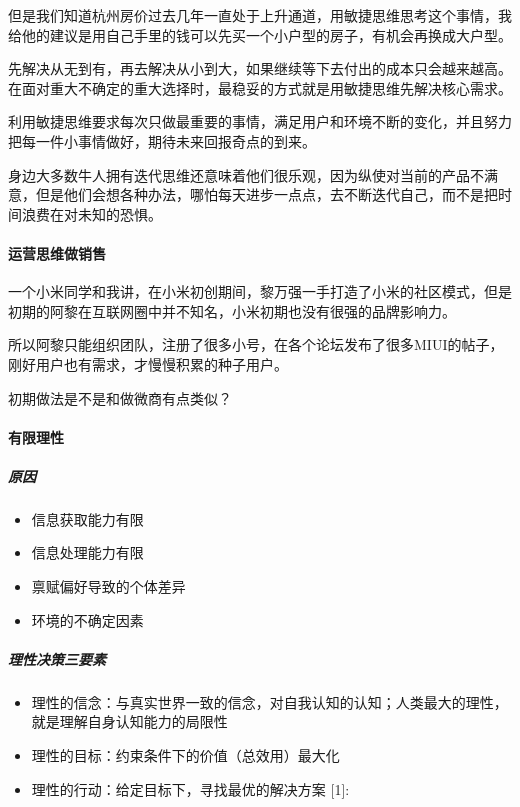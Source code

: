 \documentclass[letterpaper,11pt,english]{sphinxmanual}
\begin{document}
但是我们知道杭州房价过去几年一直处于上升通道，用敏捷思维思考这个事情，我给他的建议是用自己手里的钱可以先买一个小户型的房子，有机会再换成大户型。

先解决从无到有，再去解决从小到大，如果继续等下去付出的成本只会越来越高。在面对重大不确定的重大选择时，最稳妥的方式就是用敏捷思维先解决核心需求。

利用敏捷思维要求每次只做最重要的事情，满足用户和环境不断的变化，并且努力把每一件小事情做好，期待未来回报奇点的到来。

身边大多数牛人拥有迭代思维还意味着他们很乐观，因为纵使对当前的产品不满意，但是他们会想各种办法，哪怕每天进步一点点，去不断迭代自己，而不是把时间浪费在对未知的恐惧。


\paragraph{运营思维做销售}
\label{\detokenize{chapter_idea/idea:id5}}
一个小米同学和我讲，在小米初创期间，黎万强一手打造了小米的社区模式，但是初期的阿黎在互联网圈中并不知名，小米初期也没有很强的品牌影响力。

所以阿黎只能组织团队，注册了很多小号，在各个论坛发布了很多MIUI的帖子，刚好用户也有需求，才慢慢积累的种子用户。

初期做法是不是和做微商有点类似？


\paragraph{有限理性}
\label{\detokenize{chapter_idea/idea:id6}}

\subparagraph{原因}
\label{\detokenize{chapter_idea/idea:id7}}\begin{itemize}
\item {} 
信息获取能力有限

\item {} 
信息处理能力有限

\item {} 
禀赋偏好导致的个体差异

\item {} 
环境的不确定因素

\end{itemize}


\subparagraph{理性决策三要素}
\label{\detokenize{chapter_idea/idea:id8}}\begin{itemize}
\item {} 
理性的信念：与真实世界一致的信念，对自我认知的认知；人类最大的理性，就是理解自身认知能力的局限性

\item {} 
理性的目标：约束条件下的价值（总效用）最大化

\item {} 
理性的行动：给定目标下，寻找最优的解决方案 {[}1{]}:

\end{itemize}
\end{document}
